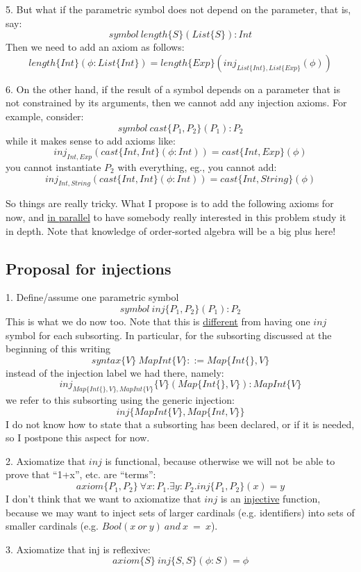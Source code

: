 \documentclass[UTF8,11pt]{article}
\theoremstyle{plain}
\theoremstyle{definition}
\theoremstyle{remark}
\begin{document}
5. But what if the parametric symbol does not depend on the parameter, that is, say:
\[symbol\ length\{S\}(List\{S\}):Int\]
Then we need to add an axiom as follows:
\[length\{Int\}(\phi:List\{Int\})=length\{Exp\}(inj_{List\{Int\},List\{Exp\}}(\phi))\]

6. On the other hand, if the result of a symbol depends on a parameter that is not constrained by its arguments, then we cannot add any injection axioms. For example, consider:
\[symbol \  cast\{P_1,P_2\}(P_1):P_2\]
while it makes sense to add axioms like:
\[inj_{Int,Exp}(cast\{Int,Int\}(\phi:Int))=cast\{Int,Exp\}(\phi)\]
you cannot instantiate $P_2$ with everything, eg., you cannot add:
\[inj_{Int,String}(cast\{Int,Int\}(\phi:Int))=cast\{Int,String\}(\phi)\]

So things are really tricky.
What I propose is to add the following axioms for now, and \underline{in parallel} to have somebody really interested in this problem study it in depth. Note that knowledge of order-sorted algebra will be a big plus here!


\subsection{Proposal for injections}

1. Define/assume one parametric symbol
\[symbol\ inj\{P_1,P_2\}(P_1):P_2\]
This is what we do now too. Note that this is \underline{different} from having one $inj$ symbol for each subsorting. In particular, for the subsorting discussed at the beginning of this writing
\[syntax \{V\} \ MapInt\{V\} ::= Map\{Int\{\}, V\}\]
instead of the injection label we had there, namely:
\[inj_{Map\{Int\{\},V\},MapInt\{V\}}\{V\}(Map\{Int\{\},V\}):MapInt\{V\}\]
we refer to this subsorting using the generic injection:
\[inj\{MapInt\{V\},Map\{Int,V\}\}\]
I do not know how to state that a subsorting has been declared, or if it is needed, so I postpone this aspect for now.

2. Axiomatize that $inj$ is functional, because otherwise we will not be able to prove that ``1+x'', etc. are ``terms'':
\[axiom\{P_1,P_2\} \ \forall x:P_1 . \exists y:P_2 . inj\{P_1,P_2\}(x)=y\]
I don't think that we want to axiomatize that $inj$ is an \underline{injective} function, because we may want to inject sets of larger cardinals (e.g. identifiers) into sets of smaller cardinals (e.g. $Bool(x\ or\ y)\ and\ x\ =\ x$).

3. Axiomatize that inj is reflexive:
\[axiom\{S\} \ inj\{S,S\}(\phi:S)=\phi\]
\end{document}
